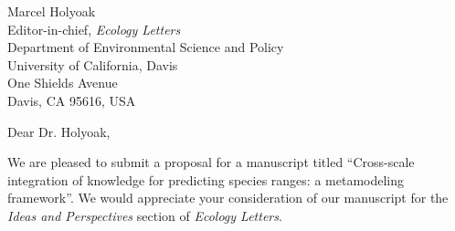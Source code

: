 \documentclass[11pt]{letter}
\begin{document}

\begin{letter}{Marcel Holyoak \\ 
	Editor-in-chief, \emph{Ecology Letters} \\ 
	Department of Environmental Science and Policy \\
	University of California, Davis \\
	One Shields Avenue \\
	Davis, CA 95616, USA }

\opening{Dear Dr. Holyoak,}

We are pleased to submit a proposal for a manuscript titled ``Cross-scale integration of knowledge for predicting species ranges: a metamodeling framework''. 
We would appreciate your consideration of our manuscript for the \emph{Ideas and Perspectives} section of \emph{Ecology Letters}.





%
%
%




\end{letter}
\end{document}
